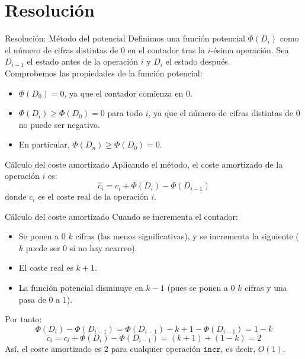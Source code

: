 \documentclass[aspectratio=169]{beamer}
\begin{document}
\section{Resolución}

\begin{frame}{Resolución: Método del potencial}
    Definimos una función potencial $\Phi(D_i)$ como el número de cifras distintas de $0$ en el contador tras la $i$-ésima operación. Sea $D_{i-1}$ el estado antes de la operación $i$ y $D_i$ el estado después.\\

    Comprobemos las propiedades de la función potencial:
    \begin{itemize}
        \item $\Phi(D_0) = 0$, ya que el contador comienza en $0$.
        \item $\Phi(D_i) \geq \Phi(D_0) = 0$ para todo $i$, ya que el número de cifras distintas de $0$ no puede ser negativo.
        \item En particular, $\Phi(D_n) \geq \Phi(D_0) = 0$.
    \end{itemize}
\end{frame}

\begin{frame}{Cálculo del coste amortizado}
    Aplicando el método, el coste amortizado de la operación $i$ es:
    \[
        \hat{c}_i = c_i + \Phi(D_i) - \Phi(D_{i-1})
    \]
    donde $c_i$ es el coste real de la operación $i$.
\end{frame}

\begin{frame}{Cálculo del coste amortizado}
    Cuando se incrementa el contador:
    \begin{itemize}
        \item Se ponen a $0$ $k$ cifras (las menos significativas), y se incrementa la
              siguiente ($k$ puede ser $0$ si no hay acarreo).
        \item El coste real es $k+1$.
        \item La función potencial disminuye en $k-1$ (pues se ponen a $0$ $k$ cifras y una
              pasa de $0$ a $1$).
    \end{itemize}
    Por tanto:
    \[
        \Phi(D_i) - \Phi(D_{i-1}) = \Phi(D_{i-1}) - k + 1 - \Phi(D_{i-1}) = 1 - k
    \]
    \[
        \hat{c}_i = c_i + \Phi(D_i) - \Phi(D_{i-1}) = (k+1) + (1-k) = 2
    \]
    Así, el coste amortizado es $2$ para cualquier operación $\texttt{incr}$, es
    decir, $O(1)$.
\end{frame}
\end{document}
